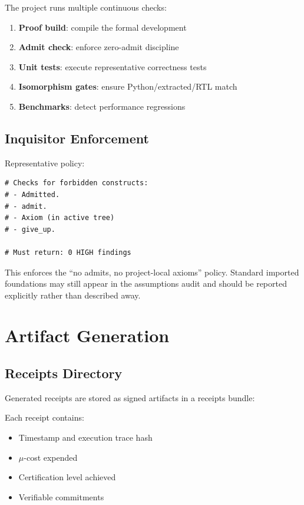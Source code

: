 The project runs multiple continuous checks:
\begin{enumerate}
    \item \textbf{Proof build}: compile the formal development
    \item \textbf{Admit check}: enforce zero-admit discipline
    \item \textbf{Unit tests}: execute representative correctness tests
    \item \textbf{Isomorphism gates}: ensure Python/extracted/RTL match
    \item \textbf{Benchmarks}: detect performance regressions
\end{enumerate}

\subsection{Inquisitor Enforcement}

Representative policy:
\begin{lstlisting}
# Checks for forbidden constructs:
# - Admitted.
# - admit.
# - Axiom (in active tree)
# - give_up.

# Must return: 0 HIGH findings
\end{lstlisting}

This enforces the ``no admits, no project-local axioms'' policy. Standard imported foundations may still appear in the assumptions audit and should be reported explicitly rather than described away.

\section{Artifact Generation}

\subsection{Receipts Directory}

Generated receipts are stored as signed artifacts in a receipts bundle:

Each receipt contains:
\begin{itemize}
    \item Timestamp and execution trace hash
    \item $\mu$-cost expended
    \item Certification level achieved
    \item Verifiable commitments
\end{itemize}

